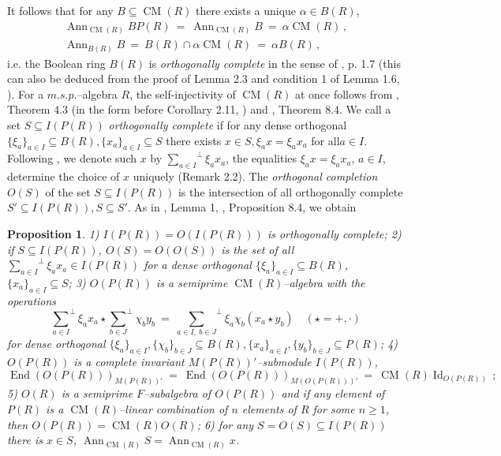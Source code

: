 \documentclass[a4paper,11pt]{article}
\newtheorem{prop}[defi]{Proposition}
\DeclareMathOperator{\Id}{Id}
\DeclareMathOperator{\End}{End}
\DeclareMathOperator{\CM}{CM}
\DeclareMathOperator{\Ann}{Ann}
\begin{document}
It follows that for any ${B\subseteq \CM(R)}$ there exists a unique 
${\alpha\in B(R)}$, 
\begin{gather*}
\Ann_{\CM(R)} B P(R)\ =\ \Ann_{\CM(R)} B\ =\ \alpha \CM(R)\,,
\\ 
\Ann_{B(R)} B\ =\ B(R)\cap \alpha \CM(R)\ =\ \alpha B(R)\,, 
\end{gather*}
i.e. the Boolean ring $B(R)$ is \emph{orthogonally complete} in the sense of 
\cite{BMich}, p. 1.7 (this can also be deduced from the proof of Lemma 2.3 and 
condition 1 of Lemma 1.6, \cite{BMich}). For a $m.s.p.$--algebra $R$, the 
self-injectivity of $\CM(R)$ at once follows from \cite{Cab3}, Theorem 4.3 
(in the form before Corollary 2.11, \cite{Gol10}) and \cite{BMich}, Theorem 8.4.
We call a set ${S\subseteq I(P(R))}$ \emph{orthogonally complete} if for any 
dense orthogonal ${\{\xi_a\}_{a\in I}\subseteq B(R), 
\{x_a\}_{a\in I}\subseteq S}$ there exists ${x\in S, \xi_a x=\xi_a x_a}$ 
for all\linebreak ${a\in I}$. Following \cite{BMich}, we denote such $x$ by 
${{\sum\limits_{a\in I}}^{\perp} \xi_a x_a}$, the equalities 
${\xi_a x=\xi_a x_a}$, ${a\in I}$, determine the choice of $x$ uniquely 
(Remark 2.2). The \emph{orthogonal completion} $O(S)$ of the set 
${S\subseteq I(P(R))}$ is the intersection of all orthogonally complete 
${S'\subseteq I(P(R)), S\subseteq S'}$.
As in \cite{B6}, Lemma 1, \cite{BMich}, Proposition 8.4, we obtain 

\begin{prop}
1) ${I(P(R))=O(I(P(R)))}$ is orthogonally complete; 2) if 
${S\subseteq I(P(R))}$, ${O(S)=O(O(S))}$ is the set of all 
${{\sum\limits_{a\in I}}^{\perp} \xi_a x_a\in I(P(R))}$ for a dense 
orthogonal ${\{\xi_a\}_{a\in I}\subseteq B(R)}$, 
${\{x_a\}_{a\in I}\subseteq S}$; 
3) $O(P(R))$ is a semiprime $\CM(R)$--algebra with the operations 
\[
{\sum\limits_{a\in I}}^{\perp} \xi_a x_a\star 
{\sum\limits_{b\in J}}^{\perp} \chi_b y_b\ =\ 
{\sum\limits_{a\in I,\ b\in J}}^{\perp} \xi_a \chi_b (x_a\star y_b)\quad 
(\star=+, \cdot)
\] 
for dense orthogonal ${\{\xi_a\}_{a\in I}, 
\{\chi_b\}_{b\in J}\subseteq B(R), \{x_a\}_{a\in I}, 
\{y_b\}_{b\in J}\subseteq P(R)}$; 4) $O(P(R))$ is a complete invariant 
$M(P(R))'$--submodule $I(P(R))$, 
\[
\End(O(P(R)))_{M(P(R))'}\ =\ \End(O(P(R)))_{M(O(P(R)))'}\ =\ 
\CM(R) \Id_{O(P(R))}\,;
\] 
5) $O(R)$ is a semiprime $F$--subalgebra of $O(P(R))$ and if any element of 
$P(R)$ is a $\CM(R)$--linear combination of $n$ elements of $R$ for 
some ${n\geq 1}$, then ${O(P(R))=\CM(R) O(R)}$; 
6) for any ${S=O(S)\subseteq I(P(R))}$ there is ${x\in S}$, 
${\Ann_{\CM(R)} S=\Ann_{\CM(R)} x}$. 
\end{prop}
\end{document}
